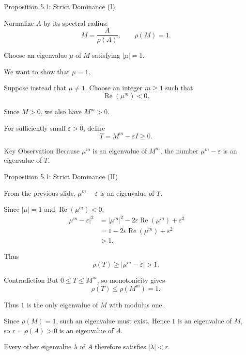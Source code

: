 \documentclass[aspectratio=169,10pt]{beamer}
\begin{document}
\begin{frame}[shrink=0]{Proposition 5.1: Strict Dominance (I)}
\small

Normalize $A$ by its spectral radius:
\[
M=\frac{A}{\rho(A)},\qquad \rho(M)=1.
\]

Choose an eigenvalue $\mu$ of $M$ satisfying
$|\mu|=1$.

We want to show that $\mu=1$.

Suppose instead that $\mu\neq1$.
Choose an integer $m\geq1$ such that
\[
\operatorname{Re}(\mu^m)<0.
\]

Since $M>0$, we also have $M^m>0$.

For sufficiently small $\varepsilon>0$,
define
\[
T=M^m-\varepsilon I\geq0.
\]

\begin{block}{Key Observation}
Because $\mu^m$ is an eigenvalue of $M^m$,
the number $\mu^m-\varepsilon$ is an
eigenvalue of $T$.
\end{block}

\end{frame}




\begin{frame}[shrink=0]{Proposition 5.1: Strict Dominance (II)}
\small

From the previous slide,
$\mu^m-\varepsilon$ is an eigenvalue of $T$.

Since $|\mu|=1$ and
$\operatorname{Re}(\mu^m)<0$,
\[
\begin{aligned}
|\mu^m-\varepsilon|^2
&=|\mu^m|^2
  -2\varepsilon\operatorname{Re}(\mu^m)
  +\varepsilon^2\\
&=1-2\varepsilon\operatorname{Re}(\mu^m)
  +\varepsilon^2\\
&>1.
\end{aligned}
\]

Thus
\[
\rho(T)\geq|\mu^m-\varepsilon|>1.
\]

\begin{block}{Contradiction}
But $0\leq T\leq M^m$, so monotonicity gives
\[
\rho(T)\leq\rho(M^m)=1.
\]
\end{block}


Thus $1$ is the only eigenvalue of $M$
with modulus one.

Since $\rho(M)=1$, such an eigenvalue
must exist. Hence $1$ is an eigenvalue
of $M$, so $r=\rho(A)>0$ is an eigenvalue
of $A$.

Every other eigenvalue $\lambda$ of $A$
therefore satisfies $|\lambda|<r$.


\end{frame}
\end{document}
